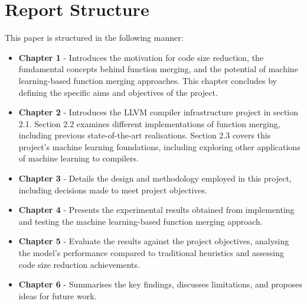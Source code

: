 \section{Report Structure}
This paper is structured in the following manner:
\begin{itemize}
    \item \textbf{Chapter 1} - Introduces the motivation for code size reduction, the fundamental concepts behind function merging, and the potential of machine learning-based function merging approaches. This chapter concludes by defining the specific aims and objectives of the project.
    \item \textbf{Chapter 2} - Introduces the LLVM compiler infrastructure project in section 2.1. Section 2.2 examines different implementations of function merging, including previous state-of-the-art realisations. Section 2.3 covers this project's machine learning foundations, including exploring other applications of machine learning to compilers.
    \item \textbf{Chapter 3} - Details the design and methodology employed in this project, including decisions made to meet project objectives.
    \item \textbf{Chapter 4} - Presents the experimental results obtained from implementing and testing the machine learning-based function merging approach.
    \item \textbf{Chapter 5} - Evaluate the results against the project objectives, analysing the model's performance compared to traditional heuristics and assessing code size reduction achievements.
    \item \textbf{Chapter 6} - Summarises the key findings, discusses limitations, and proposes ideas for future work.
\end{itemize}


